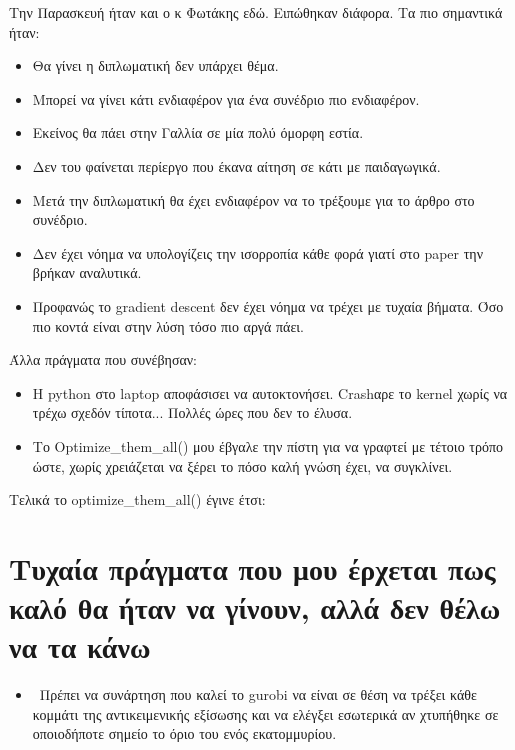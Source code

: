 \documentclass[a4paper,twoside,10pt]{article}
\begin{document}
Την Παρασκευή ήταν και ο κ Φωτάκης εδώ. Ειπώθηκαν διάφορα. Τα πιο σημαντικά ήταν:
\begin{itemize}[options]
	\item Θα γίνει η διπλωματική δεν υπάρχει θέμα.
	\item Μπορεί να γίνει κάτι ενδιαφέρον για ένα συνέδριο πιο ενδιαφέρον. 
	\item Εκείνος θα πάει στην Γαλλία σε μία πολύ όμορφη εστία. 
	\item Δεν του φαίνεται περίεργο που έκανα αίτηση σε κάτι με παιδαγωγικά. 
	\item Μετά την διπλωματική θα έχει ενδιαφέρον να το τρέξουμε για το άρθρο στο συνέδριο.
	\item Δεν έχει νόημα να υπολογίζεις την ισορροπία κάθε φορά γιατί στο paper την βρήκαν αναλυτικά. 
	\item Προφανώς το gradient descent δεν έχει νόημα να τρέχει με τυχαία βήματα. Όσο πιο κοντά είναι στην λύση τόσο πιο αργά πάει. 
\end{itemize}
Άλλα πράγματα που συνέβησαν:
\begin{itemize}
	\item Η python στο laptop αποφάσισει να αυτοκτονήσει. Crashαρε το kernel χωρίς να τρέχω σχεδόν τίποτα... Πολλές ώρες που δεν το έλυσα.
	\item Το Optimize\_them\_all() μου έβγαλε την πίστη για να γραφτεί με τέτοιο τρόπο ώστε, χωρίς χρειάζεται να ξέρει το πόσο καλή γνώση έχει, να συγκλίνει.
\end{itemize}
Τελικά το optimize\_them\_all() έγινε έτσι:













\section{Τυχαία πράγματα που μου έρχεται πως καλό θα ήταν να γίνουν, αλλά δεν θέλω να τα κάνω}
\begin{itemize}[label*={}]
	\item \lbrack \ \rbrack Πρέπει να συνάρτηση που καλεί το gurobi να είναι σε θέση να τρέξει κάθε κομμάτι της αντικειμενικής εξίσωσης και να ελέγξει εσωτερικά αν χτυπήθηκε σε οποιοδήποτε σημείο το όριο του ενός εκατομμυρίου. 
\end{itemize}
\end{document}

